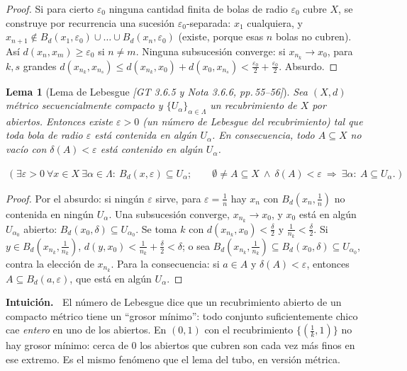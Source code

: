 \documentclass[11pt,a4paper]{article}
\newenvironment{intuicion}{\begin{cajaint}\small\textbf{Intuición.\ }}{\end{cajaint}}
\newcommand{\lgc}[1]{\par\vspace{-3pt}\begin{gather*}\big(\;#1\;\big)\end{gather*}\vspace{-6pt}}
\theoremstyle{definition}
\theoremstyle{plain}
\newtheorem{lema}[definicion]{Lema}
\newcommand{\fnt}[1]{{\normalfont\small\itshape\color{gray!150!black}[#1]}}
\newcommand{\Bola}[2]{B_d(#1,#2)}
\begin{document}
\begin{proof}
Si para cierto $\varepsilon_0$ ninguna cantidad finita de bolas de radio $\varepsilon_0$ cubre $X$, se construye por recurrencia una sucesión $\varepsilon_0$-separada: $x_1$ cualquiera, y $x_{n+1}\notin\Bola{x_1}{\varepsilon_0}\cup\dots\cup\Bola{x_n}{\varepsilon_0}$ (existe, porque esas $n$ bolas no cubren). Así $d(x_n,x_m)\ge\varepsilon_0$ si $n\ne m$. Ninguna subsucesión converge: si $x_{n_k}\to x_0$, para $k,s$ grandes $d(x_{n_k},x_{n_s})\le d(x_{n_k},x_0)+d(x_0,x_{n_s})<\tfrac{\varepsilon_0}2+\tfrac{\varepsilon_0}2$. Absurdo.
\end{proof}

\begin{lema}[Lema de Lebesgue \fnt{GT 3.6.5 y Nota 3.6.6, pp.\,55--56}]\label{cp:lebesgue}
Sea $(X,d)$ métrico secuencialmente compacto y $\{U_\alpha\}_{\alpha\in\Lambda}$ un recubrimiento de $X$ por abiertos. Entonces existe $\varepsilon>0$ (un \emph{número de Lebesgue} del recubrimiento) tal que toda bola de radio $\varepsilon$ está contenida en algún $U_\alpha$. En consecuencia, todo $A\subseteq X$ no vacío con $\delta(A)<\varepsilon$ está contenido en algún $U_\alpha$.
\lgc{\exists\varepsilon>0\ \forall x\in X\ \exists\alpha\in\Lambda:\ \Bola{x}{\varepsilon}\subseteq U_\alpha;\qquad \emptyset\ne A\subseteq X\ \wedge\ \delta(A)<\varepsilon\ \Rightarrow\ \exists\alpha:\ A\subseteq U_\alpha.}
\end{lema}

\begin{proof}
Por el absurdo: si ningún $\varepsilon$ sirve, para $\varepsilon=\tfrac1n$ hay $x_n$ con $\Bola{x_n}{\tfrac1n}$ no contenida en ningún $U_\alpha$. Una subsucesión converge, $x_{n_k}\to x_0$, y $x_0$ está en algún $U_{\alpha_0}$ abierto: $\Bola{x_0}{\delta}\subseteq U_{\alpha_0}$. Se toma $k$ con $d(x_{n_k},x_0)<\tfrac\delta2$ y $\tfrac1{n_k}<\tfrac\delta2$. Si $y\in\Bola{x_{n_k}}{\tfrac1{n_k}}$, $d(y,x_0)<\tfrac1{n_k}+\tfrac\delta2<\delta$; o sea $\Bola{x_{n_k}}{\tfrac1{n_k}}\subseteq\Bola{x_0}{\delta}\subseteq U_{\alpha_0}$, contra la elección de $x_{n_k}$.
Para la consecuencia: si $a\in A$ y $\delta(A)<\varepsilon$, entonces $A\subseteq\Bola{a}{\varepsilon}$, que está en algún $U_\alpha$.
\end{proof}

\begin{intuicion}
El número de Lebesgue dice que un recubrimiento abierto de un compacto métrico tiene un ``grosor mínimo'': todo conjunto suficientemente chico cae \emph{entero} en uno de los abiertos. En $(0,1)$ con el recubrimiento $\{(\tfrac1k,1)\}$ no hay grosor mínimo: cerca de $0$ los abiertos que cubren son cada vez más finos en ese extremo. Es el mismo fenómeno que el lema del tubo, en versión métrica.
\end{intuicion}
\end{document}
